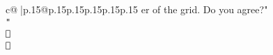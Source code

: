 \documentclass{article}
\begin{document}
{\begin{supertabular}{c@{$\;$}|p{.15\linewidth}@{}p{.15\linewidth}p{.15\linewidth}p{.15\linewidth}p{.15\linewidth}p{.15\linewidth}}
{{{er of the grid. Do you agree?"\\ \tt "\\ \tt 📐\\ \tt 📐\\ \tt }}}
\end{supertabular}}
\end{document}
